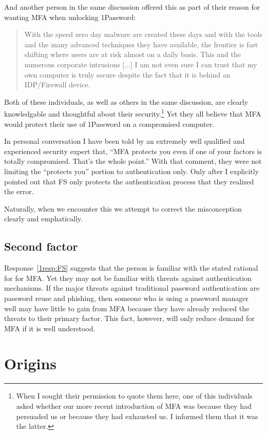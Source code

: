 \documentclass{soups}
\begin{document}
And another person in the same discussion offered this as part of their reason
for wanting MFA when unlocking 1Password:

\begin{quotation}
  With the speed zero day malware are created these days and with the tools and the many advanced techniques they have available, the frontier is fast shifting where users are at risk almost on a daily basis. This and the numerous corporate intrusions [...] I am not even sure I can trust that my own computer is truly secure despite the fact that it is behind an IDP/Firewall device.
\end{quotation}

Both of these individuals, as well as others in the same discussion,
are clearly knowledgable and thoughtful about their security.\footnote{When I sought their permission to quote them here, one of this individuals asked whether our more recent introduction of MFA was because they had persuaded us or because they had exhausted us. I informed them that it was the latter.} 
Yet they all believe that MFA would protect their use of 1Password on a compromised computer.

In personal conversation I have been told by an extremely well qualified and experienced security expert that,
 “MFA protects you even if one of your factors is totally compromised. That's the whole point.”
With that comment, they were not limiting the “protects you” portion to authentication only.
Only after I explicitly pointed out that FS only protects the authentication process that they realized the error.

Naturally, when we encounter this we attempt to correct the misconception 
clearly and emphatically.

\subsection{Second factor}

Response~\ref{1resp:FS} suggests that the person is familiar with the stated rational for for MFA.\@
Yet they may not be familiar with threats against authentication mechanisms.
If the major threats against traditional password authentication are password reuse and phishing,
then someone who is using a password manager well may have little to gain from
MFA because they have already reduced the threats to their primary factor.
This fact, however, will only reduce demand for MFA if it is well understood.

\section{Origins}
\end{document}
